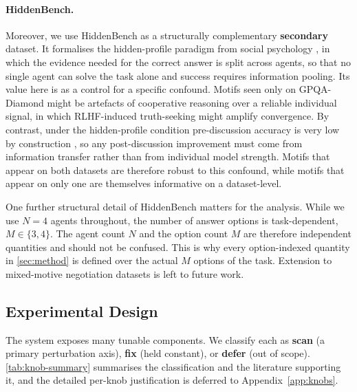 \paragraph{HiddenBench.}
\label{sec:setup:datasets:hiddenbench}
Moreover, we use HiddenBench \citep{li2026hiddenbench} as a structurally complementary
\textbf{secondary} dataset. It formalises the
hidden-profile paradigm from social psychology
\citep{stasser1985pooling, schulzhardt2012synergy}, in which the evidence needed for the
correct answer is split across agents, so that no single agent can solve the task
alone and success requires information pooling. Its value here is as a
control for a specific confound. Motifs seen only on GPQA-Diamond might be
artefacts of cooperative reasoning over a reliable individual signal, in which
\ac{RLHF}-induced truth-seeking \citep{ouyang2022instructgpt} might amplify convergence.
By contrast, under the hidden-profile condition pre-discussion accuracy is very
low by construction \citep{li2026hiddenbench}, so any post-discussion improvement
must come from information transfer rather than from individual model strength.
Motifs that appear on both datasets are therefore robust to this confound,
while motifs that appear on only one are themselves informative on a dataset-level.

One further structural detail of HiddenBench matters for the analysis. While we use
$N = 4$ agents throughout, the number of answer options is task-dependent,
$M \in \{3, 4\}$. The agent count $N$ and the option count $M$ are therefore
independent quantities and should not be confused. This is why every
option-indexed quantity in \autoref{sec:method} is defined over the actual
$M$ options of the task.
Extension to mixed-motive negotiation datasets is left to future work.

\subsection{Experimental Design}
\label{sec:setup:design}

The system exposes many tunable components. We classify each as \textbf{scan} (a
primary perturbation axis), \textbf{fix} (held constant), or \textbf{defer} (out
of scope). \autoref{tab:knob-summary} summarises the classification and the
literature supporting it, and the detailed per-knob justification is deferred to
Appendix~\ref{app:knobs}.

